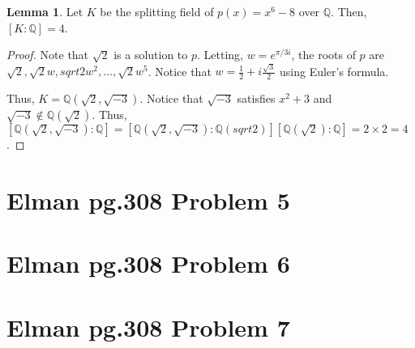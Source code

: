 \documentclass{article}
\theoremstyle{definition}
\newtheorem{lemma}[theorem]{Lemma}
\newcommand{\Q}{\mathbb{Q}}
\begin{document}
\begin{lemma}
    Let $K$ be the splitting field of $p(x) = x^{6} - 8$ over $\Q$.
    Then, $[K : \Q] = 4$.
\end{lemma}
\begin{proof}
    Note that $\sqrt{2}$ is a solution to $p$. Letting, $w = e^{\pi / 3 i}$,
    the roots of $p$ are $\sqrt{2}, \sqrt{2} w, sqrt{2} w^{2},...,\sqrt{2}w^{5}$.
    Notice that $w = \frac{1}{2} + i \frac{\sqrt{3}}{2}$ using Euler's formula.

    Thus, $K = \Q(\sqrt{2},\sqrt{-3})$. Notice that $\sqrt{-3}$ satisfies $x^{2} + 3$
    and $\sqrt{-3} \notin \Q(\sqrt{2})$. Thus, $[\Q(\sqrt{2},\sqrt{-3}): \Q] = [\Q(\sqrt{2},\sqrt{-3}): \Q(sqrt{2})][\Q(\sqrt{2}): \Q]
    = 2 \times 2 = 4$.
\end{proof}

\newpage

\section{Elman pg.308 Problem 5}


\newpage

\section{Elman pg.308 Problem 6}



\newpage

\section{Elman pg.308 Problem 7}
\end{document}
